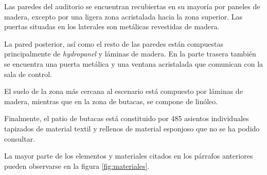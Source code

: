 \documentclass[11pt,a4paper,twoside]{book}
\begin{document}
 			Las paredes del auditorio se encuentran recubiertas en su mayoría por paneles de madera, excepto por una ligera zona acristalada hacia la zona superior. Las puertas situadas en los laterales son metálicas revestidas de madera. 
 
 			La pared posterior, así como el resto de las paredes están compuestas principalmente de \textit{hydropanel} y láminas de madera. En la parte trasera también se encuentra una puerta metálica y una ventana acristalada que comunican con la sala de control.
 
 			El suelo de la zona más cercana al escenario está compuesto por láminas de madera, mientras que en la zona de butacas, se compone de linóleo.
 			
 			Finalmente, el patio de butacas está constituido por 485 asientos individuales tapizados de material textil y rellenos de material esponjoso que no se ha podido consultar.
 
 			La mayor parte de los elementos y materiales citados en los párrafos anteriores pueden observarse en la figura \ref{fig:materiales}.
 
\end{document}
